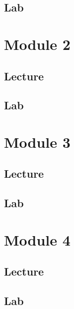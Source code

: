 \documentclass[
]{book}
\begin{document}
\section{Lab}\label{lab}

\chapter{Module 2}\label{module-2}

\section{Lecture}\label{lecture-1}

\section{Lab}\label{lab-1}

\chapter{Module 3}\label{module-3}

\section{Lecture}\label{lecture-2}

\section{Lab}\label{lab-2}

\chapter{Module 4}\label{module-4}

\section{Lecture}\label{lecture-3}

\section{Lab}\label{lab-3}

  
\end{document}
